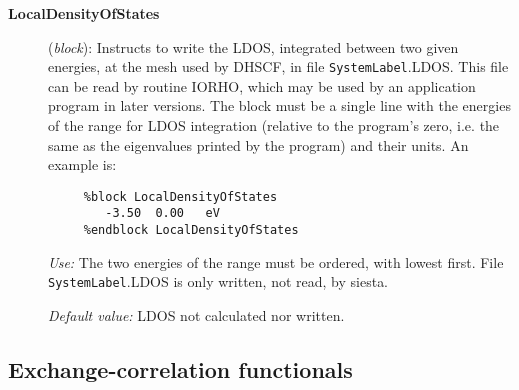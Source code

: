 \documentclass[11pt]{article}
\begin{document}
\begin{description}
\item[{\bf LocalDensityOfStates}] ({\it block}): 
Instructs to write the LDOS, integrated between two given energies,
at the mesh used by DHSCF,
in file {\tt SystemLabel}.LDOS. This file can be read by routine IORHO,
which may be used by an application program in later versions.
The block must be a single line with the energies of the range for 
LDOS integration
(relative to the program's zero, i.e. the same as the eigenvalues
printed by the program) and their units.
An example is:

\begin{verbatim}
     %block LocalDensityOfStates
        -3.50  0.00   eV
     %endblock LocalDensityOfStates
\end{verbatim}

{\it Use:} The two energies of the range must be ordered,
with lowest first.
File {\tt SystemLabel}.LDOS is only written, not read, by siesta.

{\it Default value:} LDOS not calculated nor written.
        
\end{description}

\vspace{5pt}
\subsection{Exchange-correlation functionals}
\end{document}
